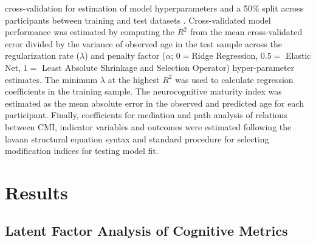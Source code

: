 \documentclass[utf8]{frontiersSCNS} %
\begin{document}
cross-validation for estimation of model hyperparameters and a 50\% split across participants between training and test datasets \citep{FriedmanHastieTibshirani2010, friedman2009glmnet}. Cross-validated model performance was estimated by computing the $R^2$ from the mean cross-validated error divided by the variance of observed age in the test sample across the regularization rate ($\lambda$) and penalty factor ($\alpha$; $0 = $Ridge Regression, $0.5 = $ Elastic Net, $1 =$ Least Absolute Shrinkage and Selection Operator) hyper-parameter estimates. The minimum $\lambda$ at the highest $R^2$ was used to calculate regression coefficients in the training sample. The neurocognitive maturity index was estimated as the mean absolute error in the observed and predicted age for each participant. Finally, coefficients for mediation and path analysis of relations between CMI, indicator variables and outcomes were estimated following the lavaan structural equation syntax and standard procedure for selecting modification indices for testing model fit.
\section{Results} 
\subsection{Latent Factor Analysis of Cognitive Metrics} 
\end{document}
